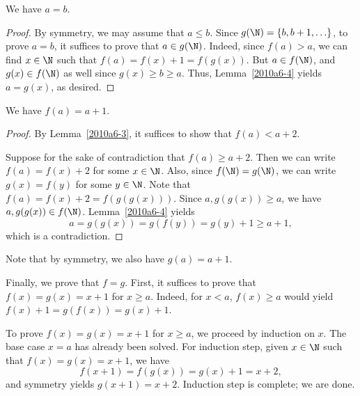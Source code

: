 \begin{lemma}\label{2010a6-5}
We have $a = b$.
\end{lemma}
\begin{proof}
By symmetry, we may assume that $a \leq b$.
Since $g(\N) = \{b, b + 1, \ldots\}$, to prove $a = b$, it suffices to prove that $a \in g(\N)$.
Indeed, since $f(a) > a$, we can find $x \in \N$ such that $f(a) = f(x) + 1 = f(g(x))$.
But $a \in f(\N)$, and $g(x) \in f(\N)$ as well since $g(x) \geq b \geq a$.
Thus, Lemma~\ref{2010a6-4} yields $a = g(x)$, as desired.
\end{proof}

\begin{lemma}\label{2010a6-6}
We have $f(a) = a + 1$.
\end{lemma}
\begin{proof}
By Lemma~\ref{2010a6-3}, it suffices to show that $f(a) < a + 2$.

Suppose for the sake of contradiction that $f(a) \geq a + 2$.
Then we can write $f(a) = f(x) + 2$ for some $x \in \N$.
Also, since $f(\N) = g(\N)$, we can write $g(x) = f(y)$ for some $y \in \N$.
Note that $f(a) = f(x) + 2 = f(g(g(x)))$.
Since $a, g(g(x)) \geq a$, we have $a, g(g(x)) \in f(\N)$.
Lemma~\ref{2010a6-4} yields
\[ a = g(g(x)) = g(f(y)) = g(y) + 1 \geq a + 1, \]
    which is a contradiction.
\end{proof}

Note that by symmetry, we also have $g(a) = a + 1$.

Finally, we prove that $f = g$.
First, it suffices to prove that $f(x) = g(x) = x + 1$ for $x \geq a$.
Indeed, for $x < a$, $f(x) \geq a$ would yield $f(x) + 1 = g(f(x)) = g(x) + 1$.

To prove $f(x) = g(x) = x + 1$ for $x \geq a$, we proceed by induction on $x$.
The base case $x = a$ has already been solved.
For induction step, given $x \in \N$ such that $f(x) = g(x) = x + 1$, we have
\[ f(x + 1) = f(g(x)) = g(x) + 1 = x + 2, \]
    and symmetry yields $g(x + 1) = x + 2$.
Induction step is complete; we are done.
